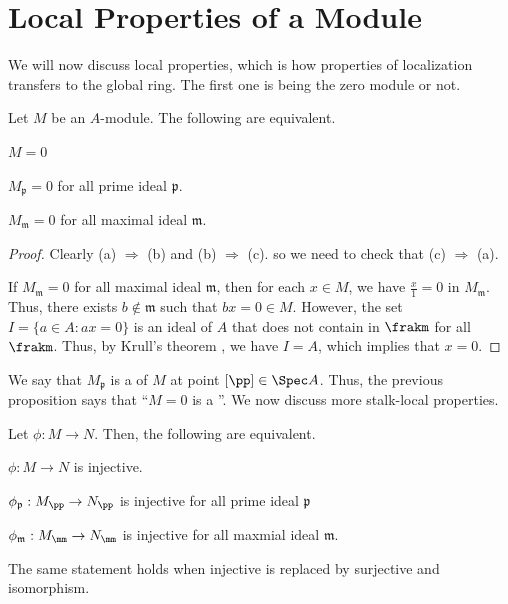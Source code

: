 \section{Local Properties of a Module}
We will now discuss local properties,
which is how properties of localization
transfers to the global ring. The first one is
being the zero module or not.
\begin{proposition}
    \label{prop:zero_local}
    Let $M$ be an $A$-module. The following are equivalent.
    \begin{alphenum}
	\item $M=0$
	\item $M_{\mathfrak p} = 0$
	    for all prime ideal $\mathfrak p$.
	\item $M_{\mathfrak m}=0$
	    for all maximal ideal $\mathfrak m$.
    \end{alphenum}
\end{proposition}
\begin{proof}
    Clearly (a) $\Rightarrow$ (b) 
    and (b) $\Rightarrow$ (c).
    so we need to check that (c) $\Rightarrow$ (a).

    If $M_{\mathfrak m}=0$ for all maximal ideal $\mathfrak m$,
    then for each $x\in M$, we have $\frac x1=0$
    in $M_{\mathfrak m}$.
    Thus, there exists $b\notin\mathfrak m$
    such that $bx=0\in M$.
    However, the set $I=\{a\in A : ax=0\}$ is an ideal of $A$
    that does not contain in $\frakm$ for all $\frakm$.
    Thus, by Krull's theorem , we have $I=A$, 
    which implies that $x=0$.
\end{proof}
We say that $M_{\mathfrak p}$ is a 
of $M$ at point $[\pp]\in\Spec A$.
Thus, the previous proposition says that
``$M=0$ is a ''.
We now discuss more stalk-local properties.
\begin{corollary}
    \label{cor:injective_surjective_local}
    Let $\phi : M\to N$. Then, the following are equivalent.
    \begin{alphenum}
	\item $\phi : M\to N$ is injective.
	\item $\phi_{\mathfrak p} : M_\pp\to N_\pp$
	    is injective for all prime ideal $\mathfrak p$
	\item $\phi_{\mathfrak m}
    : M_\mm \to N_\mm$
	    is injective for all maxmial ideal $\mathfrak m$.
    \end{alphenum}
    The same statement holds when injective is replaced by
    surjective and isomorphism.
\end{corollary}
